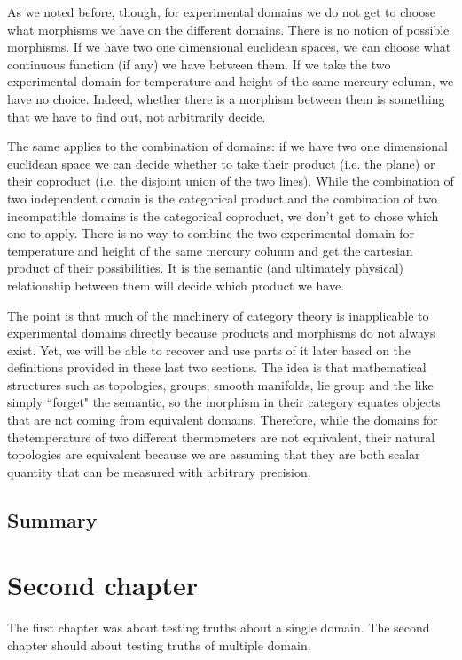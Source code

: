 \documentclass[11pt,letterpaper,fleqn]{memoir} %
\begin{document}
As we noted before, though, for experimental domains we do not get to choose what morphisms we have on the different domains. There is no notion of possible morphisms. If we have two one dimensional euclidean spaces, we can choose what continuous function (if any) we have between them. If we take the two experimental domain for temperature and height of the same mercury column, we have no choice. Indeed, whether there is a morphism between them is something that we have to find out, not arbitrarily decide.

The same applies to the combination of domains: if we have two one dimensional euclidean space we can decide whether to take their product (i.e. the plane) or their coproduct (i.e. the disjoint union of the two lines). While the combination of two independent domain is the categorical product and the combination of two incompatible domains is the categorical coproduct, we don't get to chose which one to apply. There is no way to combine the two experimental domain for temperature and height of the same mercury column and get the cartesian product of their possibilities. It is the semantic (and ultimately physical) relationship between them  will decide which product we have.

The point is that much of the machinery of category theory is inapplicable to experimental domains directly because products and morphisms do not always exist. Yet, we will be able to recover and use parts of it later based on the definitions provided in these last two sections. The idea is that mathematical structures such as topologies, groups, smooth manifolds, lie group and the like simply ``forget" the semantic, so the morphism in their category equates objects that are not coming from equivalent domains. Therefore, while the domains for thetemperature of two different thermometers are not equivalent, their natural topologies are equivalent because we are assuming that they are both scalar quantity that can be measured with arbitrary precision.

\section{Summary}

\chapter{Second chapter}

The first chapter was about testing truths about a single domain. The second chapter should about testing truths of multiple domain.
\end{document}
